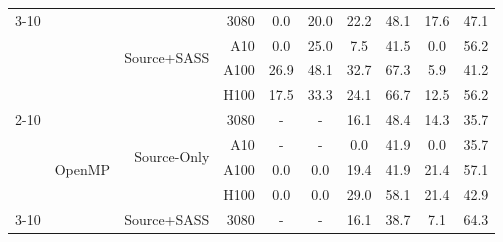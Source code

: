 \begin{table}[]
{\begin{tabular}{@{}rrrrcc|cc|cc@{}}
\cmidrule(lr){3-10}
 &  & \multirow{4}{*}{Source+SASS} & 3080 & \cellcolor[rgb]{1.000,1.000,1.000}0.0 & \cellcolor[rgb]{1.000,0.924,0.924}20.0 & \cellcolor[rgb]{1.000,0.910,0.910}22.2 & \cellcolor[rgb]{1.000,0.690,0.690}48.1 & \cellcolor[rgb]{1.000,0.938,0.938}17.6 & \cellcolor[rgb]{1.000,0.700,0.700}47.1 \\
 &  &  & A10 & \cellcolor[rgb]{1.000,1.000,1.000}0.0 & \cellcolor[rgb]{1.000,0.891,0.891}25.0 & \cellcolor[rgb]{1.000,0.984,0.984}7.5 & \cellcolor[rgb]{1.000,0.755,0.755}41.5 & \cellcolor[rgb]{1.000,1.000,1.000}0.0 & \cellcolor[rgb]{1.000,0.602,0.602}56.2 \\
 &  &  & A100 & \cellcolor[rgb]{1.000,0.878,0.878}26.9 & \cellcolor[rgb]{1.000,0.690,0.690}48.1 & \cellcolor[rgb]{1.000,0.833,0.833}32.7 & \cellcolor[rgb]{1.000,0.469,0.469}67.3 & \cellcolor[rgb]{1.000,0.989,0.989}5.9 & \cellcolor[rgb]{1.000,0.758,0.758}41.2 \\
 &  &  & H100 & \cellcolor[rgb]{1.000,0.939,0.939}17.5 & \cellcolor[rgb]{1.000,0.828,0.828}33.3 & \cellcolor[rgb]{1.000,0.897,0.897}24.1 & \cellcolor[rgb]{1.000,0.477,0.477}66.7 & \cellcolor[rgb]{1.000,0.964,0.964}12.5 & \cellcolor[rgb]{1.000,0.602,0.602}56.2 \\
\cmidrule(lr){2-10}
 & \multirow{8}{*}{OpenMP} & \multirow{4}{*}{Source-Only} & 3080 & \cellcolor[rgb]{1.000,1.000,1.000}- & \cellcolor[rgb]{1.000,1.000,1.000}- & \cellcolor[rgb]{1.000,0.946,0.946}16.1 & \cellcolor[rgb]{1.000,0.687,0.687}48.4 & \cellcolor[rgb]{1.000,0.955,0.955}14.3 & \cellcolor[rgb]{1.000,0.808,0.808}35.7 \\
 &  &  & A10 & \cellcolor[rgb]{1.000,1.000,1.000}- & \cellcolor[rgb]{1.000,1.000,1.000}- & \cellcolor[rgb]{1.000,1.000,1.000}0.0 & \cellcolor[rgb]{1.000,0.751,0.751}41.9 & \cellcolor[rgb]{1.000,1.000,1.000}0.0 & \cellcolor[rgb]{1.000,0.808,0.808}35.7 \\
 &  &  & A100 & \cellcolor[rgb]{1.000,1.000,1.000}0.0 & \cellcolor[rgb]{1.000,1.000,1.000}0.0 & \cellcolor[rgb]{1.000,0.927,0.927}19.4 & \cellcolor[rgb]{1.000,0.751,0.751}41.9 & \cellcolor[rgb]{1.000,0.915,0.915}21.4 & \cellcolor[rgb]{1.000,0.592,0.592}57.1 \\
 &  &  & H100 & \cellcolor[rgb]{1.000,1.000,1.000}0.0 & \cellcolor[rgb]{1.000,1.000,1.000}0.0 & \cellcolor[rgb]{1.000,0.862,0.862}29.0 & \cellcolor[rgb]{1.000,0.581,0.581}58.1 & \cellcolor[rgb]{1.000,0.915,0.915}21.4 & \cellcolor[rgb]{1.000,0.742,0.742}42.9 \\
\cmidrule(lr){3-10}
 &  & \multirow{4}{*}{Source+SASS} & 3080 & \cellcolor[rgb]{1.000,1.000,1.000}- & \cellcolor[rgb]{1.000,1.000,1.000}- & \cellcolor[rgb]{1.000,0.946,0.946}16.1 & \cellcolor[rgb]{1.000,0.781,0.781}38.7 & \cellcolor[rgb]{1.000,0.985,0.985}7.1 & \cellcolor[rgb]{1.000,0.507,0.507}64.3 \\

\end{tabular}}
\end{table}
